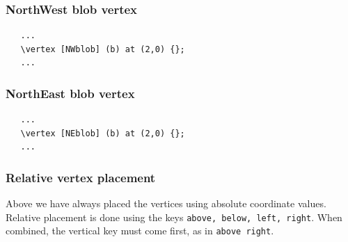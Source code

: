 \documentclass[10pt,letterpaper,twoside,notitlepage]{article}
\numberwithin{figure}{section}
\begin{document}
\subsubsection*{NorthWest blob vertex}
%
\begin{minipage}{0.7\linewidth}
\vercol\begin{verbatim}
   ...
   \vertex [NWblob] (b) at (2,0) {};
   ...
\end{verbatim}\txcol
\end{minipage}
%
\begin{minipage}{0.25\linewidth}
\end{minipage}
%
\subsubsection*{NorthEast blob vertex}
%
\begin{minipage}{0.7\linewidth}
\vercol\begin{verbatim}
   ...
   \vertex [NEblob] (b) at (2,0) {};
   ...
\end{verbatim}\txcol
\end{minipage}
%
\begin{minipage}{0.25\linewidth}
\end{minipage}
%
\subsubsection{Relative vertex placement}
\label{sec:_feynmandiagrams_vertices_relative}
%
\noindent
Above we have always placed the vertices using absolute coordinate values.
Relative placement is done using the keys
\blucol\verb$above, below, left, right$\txcol.
When combined, the vertical key must come first, as in
\blucol\verb$above right$\txcol.\\
\end{document}
